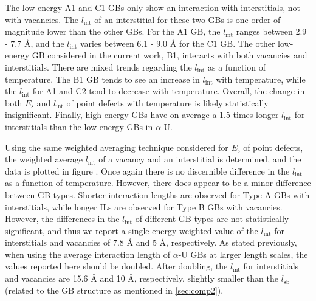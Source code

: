 \documentclass[review]{elsarticle}
\begin{document}
\par The low-energy A1 and C1 GBs only show an interaction with interstitials, not with vacancies. The $l_{\mathrm{int}}$ of an interstitial for these two GBs is one order of magnitude lower than the other GBs. For the A1 GB, the  $l_{\mathrm{int}}$ ranges between 2.9 - 7.7 {\AA}, and the  $l_{\mathrm{int}}$ varies between 6.1 - 9.0 {\AA} for the C1 GB. The other low-energy GB considered in the current work, B1, interacts with both vacancies and interstitials. There are mixed trends regarding the  $l_{\mathrm{int}}$ as a function of temperature. The B1 GB tends to see an increase in  $l_{\mathrm{int}}$ with temperature, while the $l_{\mathrm{int}}$ for A1 and C2 tend to decrease with temperature. Overall, the change in both $E_{\mathrm{s}}$ and  $l_{\mathrm{int}}$ of point defects with temperature is likely statistically insignificant. Finally, high-energy GBs have on average a 1.5 times longer $l_{\mathrm{int}}$ for interstitials than the low-energy GBs in $\alpha$-U.



\par Using the same weighted averaging technique considered for $E_{\mathrm{s}}$ of point defects, the weighted average $l_{\mathrm{int}}$ of a vacancy and an interstitial is determined, and the data is plotted in figure . Once again there is no discernible difference in the  $l_{\mathrm{int}}$ as a function of temperature. However, there does appear to be a minor difference between GB types. Shorter interaction lengths are observed for Type A GBs with interstitials, while longer ILs are observed for Type B GBs with vacancies. However, the differences in the $l_{\mathrm{int}}$ of different GB types are not statistically significant, and thus we report a single energy-weighted value of the $l_{\mathrm{int}}$ for interstitials and vacancies of 7.8 {\AA} and 5 {\AA}, respectively. As stated previously, when using the average interaction length of $\alpha$-U GBs at larger length scales, the values reported here should be doubled. After doubling, the $l_{\mathrm{int}}$ for interstitials and vacancies are 15.6 {\AA} and 10 {\AA}, respectively, slightly smaller than the $l_{\mathrm{sb}}$ (related to the GB structure as mentioned in \ref{sec:comp2}). 
\end{document}
